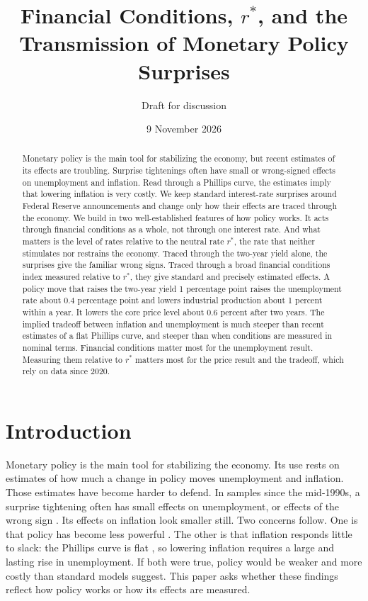 \documentclass[11pt]{article}
\title{Financial Conditions, $r^*$, and the Transmission of Monetary Policy Surprises}
\author{Draft for discussion}
\date{9 November 2026}
\newcommand{\rs}{r^{*}}
\begin{document}
\maketitle

\begin{abstract}
\noindent Monetary policy is the main tool for stabilizing the economy, but recent estimates of its effects are troubling. Surprise tightenings often have small or wrong-signed effects on unemployment and inflation. Read through a Phillips curve, the estimates imply that lowering inflation is very costly. We keep standard interest-rate surprises around Federal Reserve announcements and change only how their effects are traced through the economy. We build in two well-established features of how policy works. It acts through financial conditions as a whole, not through one interest rate. And what matters is the level of rates relative to the neutral rate $\rs$, the rate that neither stimulates nor restrains the economy. Traced through the two-year yield alone, the surprises give the familiar wrong signs. Traced through a broad financial conditions index measured relative to $\rs$, they give standard and precisely estimated effects. A policy move that raises the two-year yield 1 percentage point raises the unemployment rate about 0.4 percentage point and lowers industrial production about 1 percent within a year. It lowers the core price level about 0.6 percent after two years. The implied tradeoff between inflation and unemployment is much steeper than recent estimates of a flat Phillips curve, and steeper than when conditions are measured in nominal terms. Financial conditions matter most for the unemployment result. Measuring them relative to $\rs$ matters most for the price result and the tradeoff, which rely on data since 2020.
\end{abstract}

\section{Introduction}
Monetary policy is the main tool for stabilizing the economy. Its use rests on estimates of how much a change in policy moves unemployment and inflation. Those estimates have become harder to defend. In samples since the mid-1990s, a surprise tightening often has small effects on unemployment, or effects of the wrong sign \citep{ramey2016}. Its effects on inflation look smaller still. Two concerns follow. One is that policy has become less powerful \citep{boivin2006,boivin2010}. The other is that inflation responds little to slack: the Phillips curve is flat \citep{hazell2022,delnegro2020}, so lowering inflation requires a large and lasting rise in unemployment. If both were true, policy would be weaker and more costly than standard models suggest. This paper asks whether these findings reflect how policy works or how its effects are measured.
\end{document}

